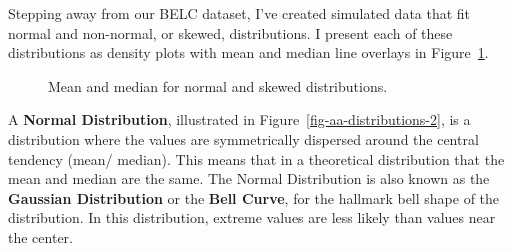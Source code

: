 \documentclass[
  letterpaper,
  DIV=11,
  numbers=noendperiod]{scrreport}
\theoremstyle{definition}
\theoremstyle{remark}
\begin{document}
Stepping away from our BELC dataset, I've created simulated data that
fit normal and non-normal, or skewed, distributions. I present each of
these distributions as density plots with mean and median line overlays
in Figure~\ref{fig-aa-distributions}.

\begin{figure}

\begin{minipage}[t]{0.33\linewidth}

{\centering 


}

\end{minipage}%
%
\begin{minipage}[t]{0.33\linewidth}

{\centering 


}

\end{minipage}%
%
\begin{minipage}[t]{0.33\linewidth}

{\centering 


}

\end{minipage}%

\caption{\label{fig-aa-distributions}Mean and median for normal and
skewed distributions.}

\end{figure}

A \textbf{Normal Distribution}, illustrated in
Figure~\ref{fig-aa-distributions-2}, is a distribution where the values
are symmetrically dispersed around the central tendency (mean/ median).
This means that in a theoretical distribution that the mean and median
are the same. The Normal Distribution is also known as the
\textbf{Gaussian Distribution} or the \textbf{Bell Curve}, for the
hallmark bell shape of the distribution. In this distribution, extreme
values are less likely than values near the center.
\end{document}
